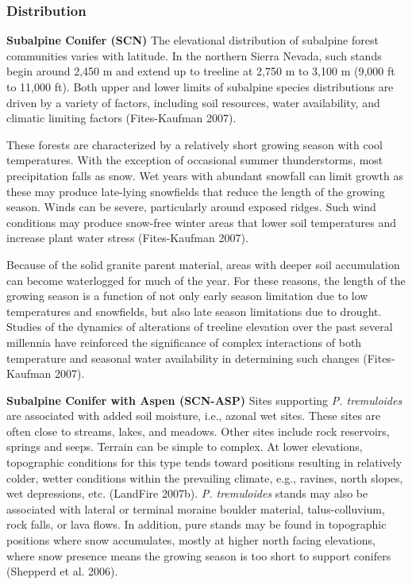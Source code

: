 \subsubsection*{Distribution}
\textbf{Subalpine Conifer (SCN)} The elevational distribution of subalpine forest communities varies with latitude. In the northern Sierra Nevada, such stands begin around 2,450 m and extend up to treeline at 2,750 m to 3,100 m (9,000 ft to 11,000 ft). Both upper and lower limits of subalpine species distributions are driven by a variety of factors, including soil resources, water availability, and climatic limiting factors (Fites-Kaufman 2007).

These forests are characterized by a relatively short growing season with cool temperatures. With the exception of occasional summer thunderstorms, most precipitation falls as snow. Wet years with abundant snowfall can limit growth as these may produce late-lying snowfields that reduce the length of the growing season. Winds can be severe, particularly around exposed ridges. Such wind conditions may produce snow-free winter areas that lower soil temperatures and increase plant water stress (Fites-Kaufman 2007).

Because of the solid granite parent material, areas with deeper soil accumulation can become waterlogged for much of the year. For these reasons, the length of the growing season is a function of not only early season limitation due to low temperatures and snowfields, but also late season limitations due to drought. Studies of the dynamics of alterations of treeline elevation over the past several millennia have reinforced the significance of complex interactions of both temperature and seasonal water availability in determining such changes (Fites-Kaufman 2007). 


\textbf{Subalpine Conifer with Aspen (SCN-ASP)} Sites supporting \emph{P. tremuloides} are associated with added soil moisture, i.e., azonal wet sites. These sites are often close to streams, lakes, and meadows. Other sites include rock reservoirs, springs and seeps. Terrain can be simple to complex. At lower elevations, topographic conditions for this type tends toward positions resulting in relatively colder, wetter conditions within the prevailing climate, e.g., ravines, north slopes, wet depressions, etc. (LandFire 2007b). \emph{P. tremuloides} stands may also be associated with lateral or terminal moraine boulder material, talus-colluvium, rock falls, or lava flows. In addition, pure stands may be found in topographic positions where snow accumulates, mostly at higher north facing elevations, where snow presence means the growing season is too short to support conifers (Shepperd et al. 2006).

